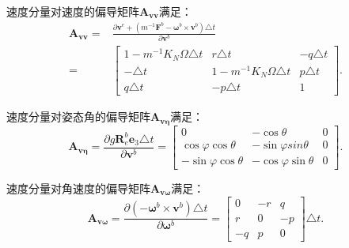 速度分量对速度的偏导矩阵$\bm{A}_{\bm{vv}}$满足：
\begin{equation}
    \begin{aligned}
        \bm{A}_{\bm{vv}} =& \frac{\partial \bm{v}^e + (m^{-1}\bm{F}^b - \bm{\omega}^b\times\bm{v}^b) \triangle t}{\partial \bm{v}^b} \\
        =& 
        \begin{bmatrix}
            1 - m^{-1} K_N \Omega \triangle t & r \triangle t & -q \triangle t \\
            - \triangle t & 1 - m^{-1} K_N \Omega \triangle t & p \triangle t \\
            q \triangle t & - p \triangle t & 1
        \end{bmatrix}.
    \end{aligned}
\end{equation}

速度分量对姿态角的偏导矩阵$\bm{A}_{\bm{v\eta}}$满足：
\begin{equation}
    \bm{A}_{\bm{v \eta}} = \frac{\partial g \bm{R}_e^b \bm{e}_3 \triangle t}{\partial \bm{v}^b} =
    \begin{bmatrix}
        0 & -\cos\theta & 0 \\
        \cos\varphi \cos\theta & -\sin\varphi sin\theta & 0 \\
        -\sin\varphi \cos\theta & -\cos\varphi \sin\theta & 0
    \end{bmatrix}.
\end{equation}

速度分量对角速度的偏导矩阵$\bm{A}_{\bm{v\omega}}$满足：
\begin{equation}
    \bm{A}_{\bm{v \omega}} = \frac{\partial (-\bm{\omega}^b \times \bm{v}^b) \triangle t}{\partial \bm{\omega}^b} =
    \begin{bmatrix}
        0 & -r & q \\
        r & 0 & -p \\
        -q & p & 0
    \end{bmatrix} \triangle t.
\end{equation}

